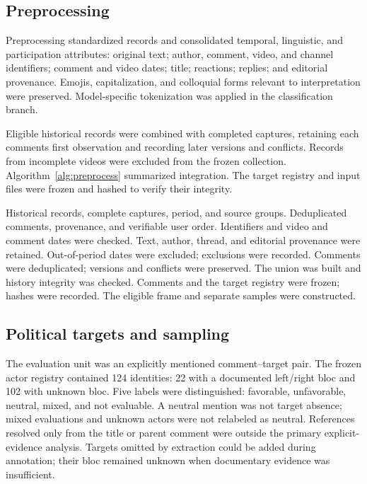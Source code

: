 \documentclass[conference,letterpaper]{IEEEtran}
\begin{document}
\subsection{Preprocessing}
Preprocessing standardized records and consolidated temporal, linguistic, and participation attributes: original text; author, comment, video, and channel identifiers; comment and video dates; title; reactions; replies; and editorial provenance. Emojis, capitalization, and colloquial forms relevant to interpretation were preserved. Model-specific tokenization was applied in the classification branch.

Eligible historical records were combined with completed captures, retaining each comment\textquotesingle s first observation and recording later versions and conflicts. Records from incomplete videos were excluded from the frozen collection. Algorithm~\ref{alg:preprocess} summarized integration. The target registry and input files were frozen and hashed to verify their integrity.

\begin{algorithm}[t]
\caption{Comment preprocessing and integration}
\label{alg:preprocess}
\begin{algorithmic}[1]
\Require Historical records, complete captures, period, and source groups.
\Ensure Deduplicated comments, provenance, and verifiable user order.
\State Identifiers and video and comment dates were checked.
\State Text, author, thread, and editorial provenance were retained.
\State Out-of-period dates were excluded; exclusions were recorded.
\State Comments were deduplicated; versions and conflicts were preserved.
\EndFor
\State The union was built and history integrity was checked.
\State Comments and the target registry were frozen; hashes were recorded.
\State The eligible frame and separate samples were constructed.
\end{algorithmic}
\end{algorithm}

\subsection{Political targets and sampling}
The evaluation unit was an explicitly mentioned comment--target pair. The frozen actor registry contained 124 identities: 22 with a documented left/right bloc and 102 with unknown bloc. Five labels were distinguished: favorable, unfavorable, neutral, mixed, and not evaluable. A neutral mention was not target absence; mixed evaluations and unknown actors were not relabeled as neutral. References resolved only from the title or parent comment were outside the primary explicit-evidence analysis. Targets omitted by extraction could be added during annotation; their bloc remained unknown when documentary evidence was insufficient.
\end{document}
